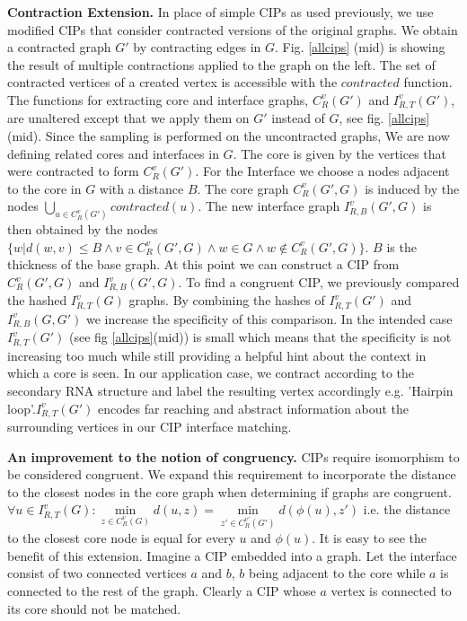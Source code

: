 \documentclass{article}
\begin{document}
\textbf{Contraction Extension.}
In place of simple CIPs as used previously,
we use modified CIPs that consider contracted versions
of the original graphs. We obtain a contracted graph $G'$ by contracting edges
in $G$. Fig. \ref{allcips} (mid) is showing the result of multiple contractions
applied to the graph on the left. The set of contracted vertices of a
created vertex is accessible with the $contracted$ function.
The functions for extracting core and interface graphs, 
$C_{R}^v(G')$ and $I_{R,T}^v(G')$, are unaltered except that we apply them
on $G'$ instead of $G$, see fig. \ref{allcips}(mid).
Since the sampling is performed on the uncontracted graphs,
We are now defining related cores and interfaces in $G$.
The core is given by the vertices that were contracted to form $C_{R}^v(G')$.
For the Interface we choose a nodes adjacent to the core in $G$ with a
distance $B$.
The core graph $C_{R}^v(G',G)$ is induced by the nodes 
$\bigcup\limits_{u \in C_R^v(G')} contracted(u)$.
The new interface graph $I_{R,B}^v(G',G)$ is then obtained by the nodes 
$\{ w | d(w,v) \leq B \wedge v\in C_R^v(G',G) \wedge w \in G \wedge w 
\notin C_R^v(G',G) \}$.  $B$ is the thickness of the base graph.
At this point we can construct a CIP from $C_R^v(G',G)$ and $I_{R,B}^v(G',G)$. 
To find a congruent CIP, we previously compared the hashed $I_{R,T}^v(G)$ 
graphs. By combining the hashes of $I_{R,T}^v(G')$ and $I_{R,B}^v(G,G')$ we
increase the specificity of this comparison.
In the intended case $I_{R,T}^v(G')$ (see fig \ref{allcips}(mid)) is small
which means that the
specificity is not increasing too much while still providing
a helpful hint about the context in which a core is seen.
In our application case, we contract according to the
secondary RNA structure and label the resulting vertex accordingly e.g.
'Hairpin loop'.$I_{R,T}^v(G')$  encodes far reaching and abstract
information about the surrounding vertices in our CIP interface matching.


\textbf{An improvement to the notion of congruency.}
CIPs require isomorphism to be considered congruent.
We expand this requirement to incorporate
the distance to the closest nodes in the core graph when 
determining if graphs are congruent.
$\forall u \in I_{R,T}^v(G) : 
\underset{z \in  C_{R}^v(G)}{\min} d(u,z) = 
\underset{z' \in  C_{R}^{v'}(G')}{\min} d(\phi(u),z') $ i.e. the distance 
to the closest core node is equal for every
$u$ and $\phi(u)$.
It is easy to see the benefit of this extension.
Imagine a CIP embedded into a graph. Let the interface consist of
two connected vertices $a$ and $b$, $b$ being adjacent to the core while
$a$ is connected to the rest of the graph.
Clearly a CIP whose $a$ vertex is connected to its core should not be matched.
\end{document}
